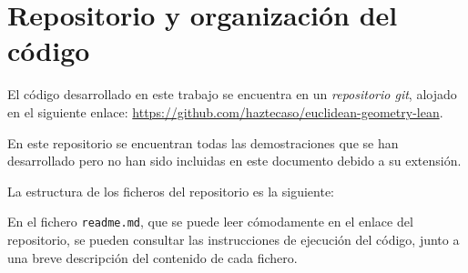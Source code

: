 \section{Repositorio y organización del código}\label{sec:repositorio}

El código desarrollado en este trabajo se encuentra en un \textit{repositorio
	git}, alojado en el siguiente enlace:
\url{https://github.com/haztecaso/euclidean-geometry-lean}.

En este repositorio se encuentran todas las demostraciones que se han
desarrollado pero no han sido incluidas en este documento debido a su extensión.

La estructura de los ficheros del repositorio es la siguiente:


En el fichero \texttt{readme.md}, que se puede leer cómodamente en el enlace del
repositorio, se pueden consultar las instrucciones de ejecución del código,
junto a una breve descripción del contenido de cada fichero.

